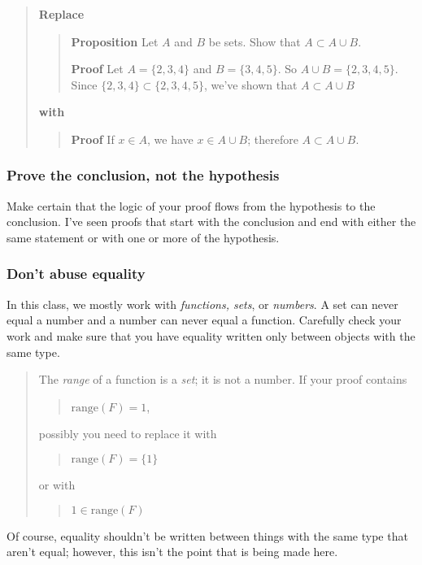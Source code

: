 \documentclass[12pt]{article}
\newcounter{ex}\setcounter{ex}{0}
\newcounter{se}\setcounter{se}{0}
\begin{document}
\begin{quote}
\textbf{Replace}
\begin{quote}
 \textbf {Proposition} Let \(A\) and \(B\) be sets.  Show that 
\(A \subset A \cup B\).

\vspace{0.1in}

\textbf{Proof} Let \(A = \{2,3,4\}\) and \(B = \{3,4,5\}\).  So
\mbox{\(A \cup B = \{2,3,4,5\}\)}.  Since \(\{2,3,4\} \subset \{2,3,4,5\}\),
we've shown that \(A \subset A \cup B\)
\end{quote}
\textbf{with}
\begin{quote}
 \textbf {Proof}  If \(x \in A\), we have \(x \in A \cup B\); therefore
\(A \subset A \cup B\).
\end{quote}
\end{quote}

 \subsubsection{ Prove the conclusion, not the hypothesis}

Make certain that the logic of your proof flows from the 
hypothesis to the conclusion. I've seen proofs that
start with the conclusion and end with either the same statement
or with one or more of the hypothesis.  



 \subsubsection{Don't abuse equality}

In this class, we mostly work with {\em functions, sets}, or {\em
numbers\/}.  A set can never equal a number and a number can never
equal a function.  Carefully check your work and make sure that you
have equality written only between objects with the same type.
\begin{quote}
The \emph{range} of a function is a \emph{set}; it is not a
number. If your proof contains
\begin{quote}
 \(\mbox{range}(F) = 1\),
\end{quote}
possibly you need to replace it with
\begin{quote}
 \(\mbox{range}(F) = \{1\}\)
\end{quote}
or with
\begin{quote}
 \(1 \in \mbox{range}(F)\)
\end{quote}
\end{quote}
Of course, equality shouldn't be written between things with the
same type that aren't equal; however, this isn't the point that 
is being made here.
\end{document}

